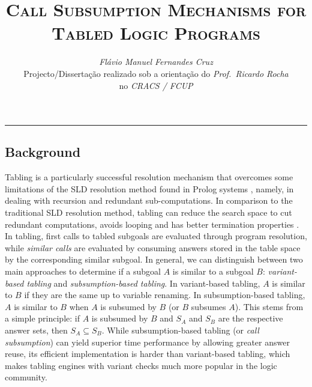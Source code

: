 \documentclass[9pt,a4paper]{extarticle}
\begin{document}
\title{\vspace*{-8mm}\textbf{\textsc{Call Subsumption Mechanisms for Tabled Logic Programs}}}
\author{\emph{Flávio Manuel Fernandes Cruz}\\[2mm]
\small{Projecto/Dissertação realizado sob a orientação do \emph{Prof.\ Ricardo Rocha}}\\
\small{no \emph{CRACS / FCUP}}}
\date{}
\maketitle
\thispagestyle{empty}

\vspace*{-4mm}\noindent\rule{\textwidth}{0.4pt}\vspace*{4mm}

\begin{multicols}{2}

\section{Background}

Tabling is a particularly successful resolution mechanism that overcomes some limitations
of the SLD resolution method found in Prolog systems \cite{Chen-96}, namely, in dealing with
recursion and redundant sub-computations. In comparison to the traditional SLD resolution method, tabling can reduce the search space to cut redundant computations,
avoids looping and has better termination properties \cite{Tamaki-86}.
In tabling, first calls to tabled subgoals are evaluated
through program resolution, while \emph{similar calls} are evaluated by consuming answers stored
in the table space by the corresponding similar subgoal.
In general, we can distinguish between two main approaches to determine if a subgoal $A$ is
similar to a subgoal $B$: \emph{variant-based tabling} and \emph{subsumption-based tabling}.
In variant-based tabling, $A$ is similar to $B$ if they are the same
up to variable renaming. In subsumption-based tabling, $A$ is similar to $B$ when $A$ is subsumed
by $B$ (or $B$ subsumes $A$). This stems from a simple principle: if $A$ is subsumed by $B$ and
$S_A$ and $S_B$ are the respective answer sets, then $S_A \subseteq S_B$.
While subsumption-based tabling (or \emph{call subsumption}) can yield superior time performance
by allowing greater answer reuse, its efficient implementation is harder than variant-based tabling,
which makes tabling engines with variant checks much more popular in the logic community.


\end{multicols}
\end{document}
